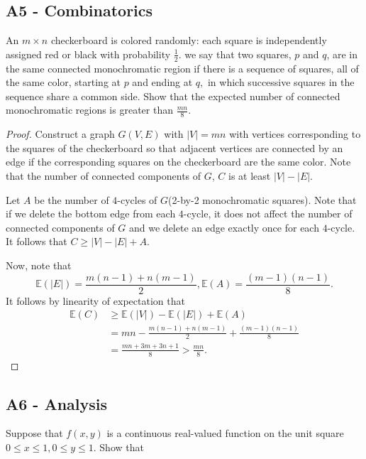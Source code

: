 \documentclass[11pt]{scrartcl}
\newcommand{\<}{\langle}
\renewcommand{\>}{\rangle}
\begin{document}
\subsection{A5 - Combinatorics}
	An $m\times n$ checkerboard is colored randomly: each square is independently assigned red or black with probability $\frac12.$ we say that two squares, $p$ and $q$, are in the same connected monochromatic region if there is a sequence of squares, all of the same color, starting at $p$ and ending at $q,$ in which successive squares in the sequence share a common side. Show that the expected number of connected monochromatic regions is greater than $\frac{mn}8.$
\begin{proof}
Construct a graph $G(V, E)$ with $|V| = mn$ with vertices corresponding to the squares of the checkerboard so that adjacent vertices are connected by an edge if the corresponding squares on the checkerboard are the same color.  Note that the number of connected components of $G$, $C$ is at least $|V| - |E|$.

Let $A$ be the number of $4$-cycles of $G$(2-by-2 monochromatic squares).  Note that if we delete the bottom edge from each $4$-cycle, it does not affect the number of connected components of $G$ and we delete an edge exactly once for each $4$-cycle.  It follows that $C \ge |V| - |E| + A$.

Now, note that 
$$\mathbb{E}(|E|) = \frac{m(n-1) + n(m-1)}{2}, \mathbb{E}(A) = \frac{(m-1)(n-1)}{8}.$$
It follows by linearity of expectation that 
\begin{align*}
\mathbb{E}(C) &\ge \mathbb{E}(|V|) - \mathbb{E}(|E|) + \mathbb{E}(A) \\
&= mn - \frac{m(n-1) + n(m-1)}{2} +  \frac{(m-1)(n-1)}{8} \\
&= \frac{mn + 3m + 3n + 1}{8} > \frac{mn}{8}.
\end{align*}
\end{proof}
\pagebreak
\subsection{A6 - Analysis}
Suppose that $f(x,y)$ is a continuous real-valued function on the unit square $0\le x\le1,0\le y\le1.$ Show that
\end{document}
